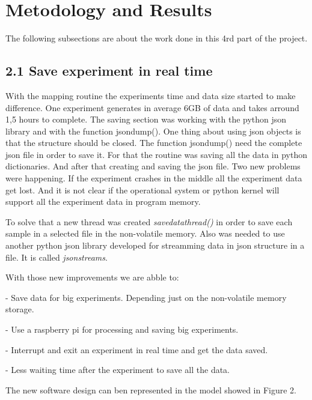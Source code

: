 \section{Metodology and Results}

    The following subsections are about the work done in this 4rd part of the project.


\subsection*{2.1 Save experiment in real time}

    With the mapping routine the experiments time and data size started to make difference.
    One experiment generates in average 6GB of data and takes arround 1,5 hours to complete.
    The saving section was working with the python json library and with the function json\textunderscore{}dump().
    One thing about using json objects is that the structure should be closed.
    The function json\textunderscore{}dump() need the complete json file in order to save it.
    For that the routine was saving all the data in python dictionaries. And after that creating and saving the json file.
    Two new problems were happening. If the experiment crashes in the middle all the experiment data get lost. 
    And it is not clear if the operational system or python kernel will support all the experiment data in program memory.

    To solve that a new thread was created \emph{save\textunderscore{}data\textunderscore{}thread()} in order to save each sample in a selected file in the non-volatile memory.
    Also was needed to use another python json library developed for streamming data in json structure in a file. It is called \emph{jsonstreams}.
    
    With those new improvements we are abble to:
        
        - Save data for big experiments. Depending just on the non-volatile memory storage.
        
        - Use a raspberry pi for processing and saving big experiments.

        - Interrupt and exit an experiment in real time and get the data saved.

        - Less waiting time after the experiment to save all the data.


    The new software design can ben represented in the model showed in Figure 2.


